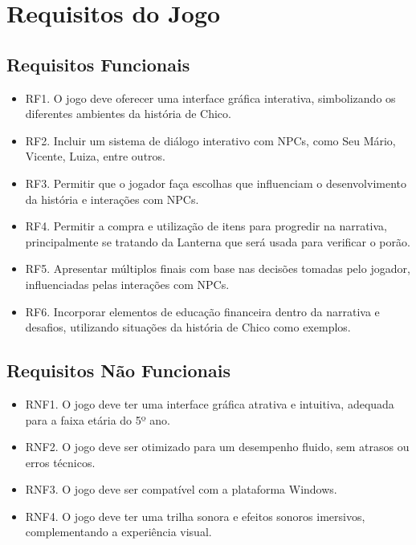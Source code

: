 \section{Requisitos do Jogo}

\subsection{Requisitos Funcionais}
\begin{itemize}
	\item RF1. O jogo deve oferecer uma interface gráfica interativa, simbolizando os diferentes ambientes da história de Chico.
	\item RF2. Incluir um sistema de diálogo interativo com NPCs, como Seu Mário, Vicente, Luiza, entre outros.
	\item RF3. Permitir que o jogador faça escolhas que influenciam o desenvolvimento da história e interações com NPCs.
	\item RF4. Permitir a compra e utilização de itens para progredir na narrativa, principalmente se tratando da Lanterna que será usada para verificar o porão.
	\item RF5. Apresentar múltiplos finais com base nas decisões tomadas pelo jogador, influenciadas pelas interações com NPCs.
	\item RF6. Incorporar elementos de educação financeira dentro da narrativa e desafios, utilizando situações da história de Chico como exemplos.
\end{itemize}

\subsection{Requisitos Não Funcionais}
\begin{itemize}
	\item RNF1. O jogo deve ter uma interface gráfica atrativa e intuitiva, adequada para a faixa etária do 5º ano.
	\item RNF2. O jogo deve ser otimizado para um desempenho fluido, sem atrasos ou erros técnicos.
	\item RNF3. O jogo deve ser compatível com a plataforma Windows.
	\item RNF4. O jogo deve ter uma trilha sonora e efeitos sonoros imersivos, complementando a experiência visual.
\end{itemize}

